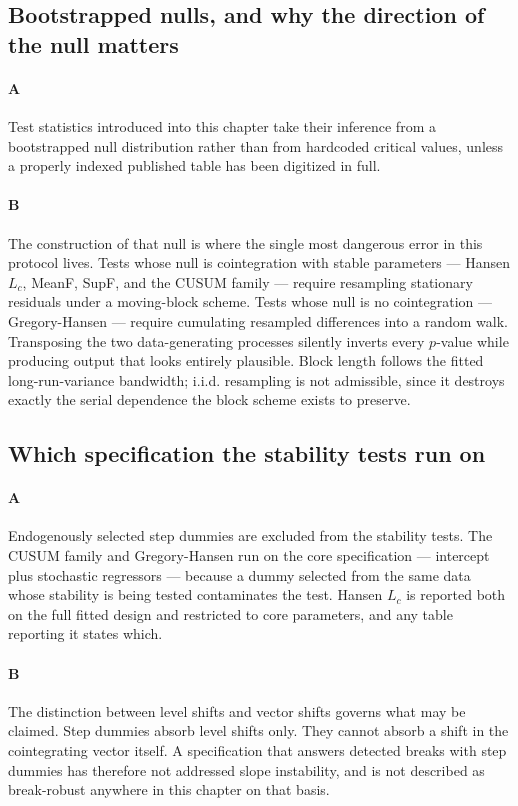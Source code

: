 \subsection{Bootstrapped nulls, and why the direction of the null matters}

\paragraph{A}
Test statistics introduced into this chapter take their inference from a bootstrapped null distribution rather than from hardcoded critical values, unless a properly indexed published table has been digitized in full.

\paragraph{B}
The construction of that null is where the single most dangerous error in this protocol lives. Tests whose null is cointegration with stable parameters — Hansen $L_c$, MeanF, SupF, and the CUSUM family — require resampling stationary residuals under a moving-block scheme. Tests whose null is no cointegration — Gregory-Hansen — require cumulating resampled differences into a random walk. Transposing the two data-generating processes silently inverts every $p$-value while producing output that looks entirely plausible. Block length follows the fitted long-run-variance bandwidth; i.i.d. resampling is not admissible, since it destroys exactly the serial dependence the block scheme exists to preserve.

\subsection{Which specification the stability tests run on}

\paragraph{A}
Endogenously selected step dummies are excluded from the stability tests. The CUSUM family and Gregory-Hansen run on the core specification — intercept plus stochastic regressors — because a dummy selected from the same data whose stability is being tested contaminates the test. Hansen $L_c$ is reported both on the full fitted design and restricted to core parameters, and any table reporting it states which.

\paragraph{B}
The distinction between level shifts and vector shifts governs what may be claimed. Step dummies absorb level shifts only. They cannot absorb a shift in the cointegrating vector itself. A specification that answers detected breaks with step dummies has therefore not addressed slope instability, and is not described as break-robust anywhere in this chapter on that basis.

